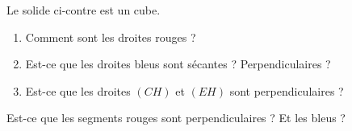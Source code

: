 
\begin{exercice}\label{exoSeconde-0087}

    \begin{multicols}{2}
            Le solide ci-contre est un cube. 
        \begin{enumerate}
            \item
        Comment sont les droites rouges ?
    \item
        Est-ce que les droites bleus sont sécantes ? Perpendiculaires ?
    \item
        Est-ce que les droites \( (CH)\) et \( (EH)\) sont perpendiculaires ?
                
        \end{enumerate}


    Est-ce que les segments rouges sont perpendiculaires ? Et les bleus ?

\columnbreak



    \end{multicols}

\end{exercice}

